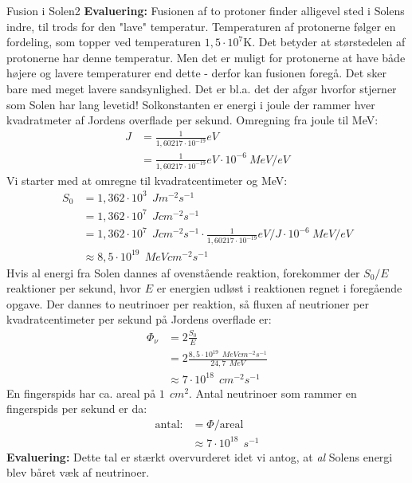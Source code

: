 \begin{opgave}{Fusion i Solen}{2}
\textbf{Evaluering:} Fusionen af to protoner finder alligevel sted i Solens indre, til trods for den "lave" temperatur. Temperaturen af protonerne følger en fordeling, som topper ved temperaturen $1,5 \cdot 10^7$K. Det betyder at størstedelen af protonerne har denne temperatur. Men det er muligt for protonerne at have både højere og lavere temperaturer end dette - derfor kan fusionen foregå. Det sker bare med meget lavere sandsynlighed. Det er bl.a. det der afgør hvorfor stjerner som Solen har lang levetid!
\opg Solkonstanten er energi i joule der rammer hver kvadratmeter af Jordens overflade per sekund. Omregning fra joule til MeV:
\begin{align*}
\si{J} &= \frac{1}{1,60217 \cdot 10^{-19}} \si{eV} \\
&= \frac{1}{1,60217 \cdot 10^{-19}} \si{eV} \cdot 10^{-6}~\si{MeV/eV} 
\end{align*} 
Vi starter med at omregne til kvadratcentimeter og MeV:
\begin{align*}
S_0 &=1,362 \cdot 10^3~\SI{}{J m^{-2} s^{-1}} \\
&=1,362 \cdot 10^7~\SI{}{J cm^{-2} s^{-1}} \\
&= 1,362 \cdot 10^7~\SI{}{J cm^{-2} s^{-1}} \cdot \frac{1}{1,60217 \cdot 10^{-19}} \si{eV/J} \cdot 10^{-6}~\si{MeV/eV} \\
&\approx 8,5 \cdot 10^{19}~\SI{}{MeV cm^{-2} s^{-1}}
\end{align*}
Hvis al energi fra Solen dannes af ovenstående reaktion, forekommer der $S_0/E$ reaktioner per sekund, hvor $E$ er energien udløst i reaktionen regnet i foregående opgave. Der dannes to neutrinoer per reaktion, så fluxen af neutrioner per kvadratcentimeter per sekund på Jordens overflade er:
\begin{align*}
\Phi_\nu &=2 \frac{S_0}{E} \\
&=2 \frac{8,5 \cdot 10^{19}~\SI{}{MeV cm^{-2} s^{-1}}}{24,7~\SI{}{MeV}} \\
&\approx 7 \cdot 10^{18}~\SI{}{cm^{-2} s^{-1}}
\end{align*}
En fingerspids har ca. areal på $1~\SI{}{cm^2}$. Antal neutrinoer som rammer en fingerspids per sekund er da:
\begin{align*}
\text{antal:} &= \Phi/\text{areal} \\
&\approx 7 \cdot 10^{18}~\SI{}{s^{-1}}
\end{align*}
\textbf{Evaluering:} Dette tal er stærkt overvurderet idet vi antog, at \emph{al} Solens energi blev båret væk af neutrinoer.
\end{opgave}

